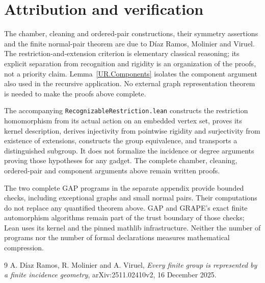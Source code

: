 \section{Attribution and verification}
The chamber, cleaning and ordered-pair constructions, their symmetry
assertions and the finite normal-pair theorem are due to D\'iaz Ramos, Molinier and Viruel. The
restriction-and-extension criterion is elementary classical reasoning; its
explicit separation from recognition and rigidity is an organization of the
proofs, not a priority claim. Lemma~\ref{UR.Components} isolates the component
argument also used in the recursive application. No external graph
representation theorem is needed to make the proofs above complete.

The accompanying \texttt{RecognizableRestriction.lean} constructs the
restriction homomorphism from its actual action on an embedded vertex set,
proves its kernel description, derives injectivity from pointwise rigidity and
surjectivity from existence of extensions, constructs the group equivalence,
and transports a distinguished subgroup. It does not formalize the incidence
or degree arguments proving those hypotheses for any gadget. The complete
chamber, cleaning, ordered-pair and component arguments above remain
written proofs.

The two complete GAP programs in the separate appendix provide bounded
checks, including exceptional graphs and small normal pairs. Their computations
do not replace any quantified theorem above. GAP and GRAPE's exact finite
automorphism algorithms remain part of the trust boundary of those checks;
Lean uses its kernel and the pinned mathlib infrastructure. Neither the number
of programs nor the number of formal declarations measures mathematical
compression.

\begin{thebibliography}{9}
 A. D\'iaz Ramos, R. Molinier and A. Viruel,
\emph{Every finite group is represented by a finite incidence geometry},
arXiv:2511.02410v2, 16 December 2025.
\end{thebibliography}
